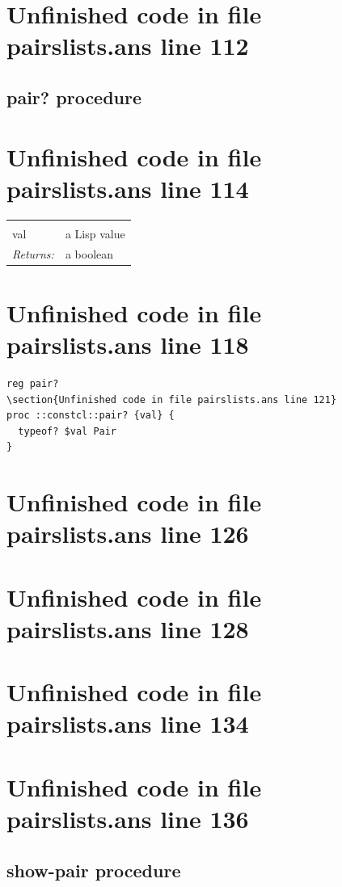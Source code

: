 \documentclass[twoside,9pt]{report}
\begin{document}
\section{Unfinished code in file pairslists.ans line 112}
\subsection{pair? procedure}
\label{pair?-procedure}
\section{Unfinished code in file pairslists.ans line 114}
\noindent\begin{tabular}{ |p{1.9cm} p{8cm}| }
\hline
\rowcolor[HTML]{CCCCCC} \multicolumn{2}{|l|}{\bf pair? (public)} \\
val & a Lisp value \\
\textit{Returns:} & a boolean \\
\hline
\end{tabular}
\section{Unfinished code in file pairslists.ans line 118}
\begin{lstlisting}
reg pair?
\section{Unfinished code in file pairslists.ans line 121}
proc ::constcl::pair? {val} {
  typeof? $val Pair
}
\end{lstlisting}
\section{Unfinished code in file pairslists.ans line 126}
\section{Unfinished code in file pairslists.ans line 128}
\section{Unfinished code in file pairslists.ans line 134}
\section{Unfinished code in file pairslists.ans line 136}
\subsection{show-pair procedure}
\label{show-pair-procedure}
\end{document}
